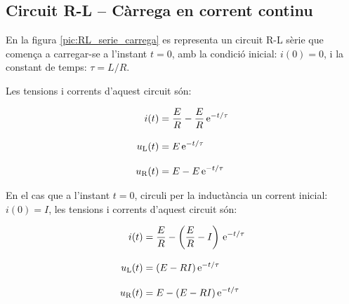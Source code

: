 \subsection{Circuit R-L -- Càrrega en corrent continu}\label{sec:RL-carrega}

En la figura \vref{pic:RL_serie_carrega} es representa un circuit R-L sèrie que comença a carregar-se a l'instant $t=0$, amb la condició inicial: $i(0) = 0$, i la constant de temps: $\tau = L/R$.
\begin{center}
    
    \label{pic:RL_serie_carrega}
\end{center}

Les tensions i corrents d'aquest circuit són:

\hfill
\begin{minipage}[b]{9cm}
    
\end{minipage}
\hfill
\begin{minipage}[b]{6cm}
    \begin{align}
        i(t) &= \frac{E}{R}  - \frac{E}{R} \,\mathrm{e}^{-t/\tau}\label{eq:RL-i-carrega} \\[3mm]
        u_\mathrm{L}(t) &= E\,\mathrm{e}^{-t/\tau}\label{eq:RL-ul-carrega} \\[3mm]
        u_\mathrm{R}(t) &= E - E\,\mathrm{e}^{-t/\tau}
    \end{align}
\end{minipage}

\vspace{5mm}
En el cas que a l'instant $t=0$, circuli per la inductància un corrent inicial: $i(0) = I$, les tensions i corrents d'aquest circuit són:

\hfill
\begin{minipage}[b]{9cm}
    
\end{minipage}
\hfill
\begin{minipage}[b]{6cm}
    \begin{align}
        i(t) &= \frac{E}{R}  - \left(\frac{E}{R}-I\right) \,\mathrm{e}^{-t/\tau}\label{eq:RL-i-carrega-ini} \\[3mm]
        u_\mathrm{L}(t) &= (E- R I)\,\mathrm{e}^{-t/\tau}\label{eq:RL-ul-carrega-ini} \\[3mm]
        u_\mathrm{R}(t) &= E - (E-R I)\,\mathrm{e}^{-t/\tau}
    \end{align}
\end{minipage}


